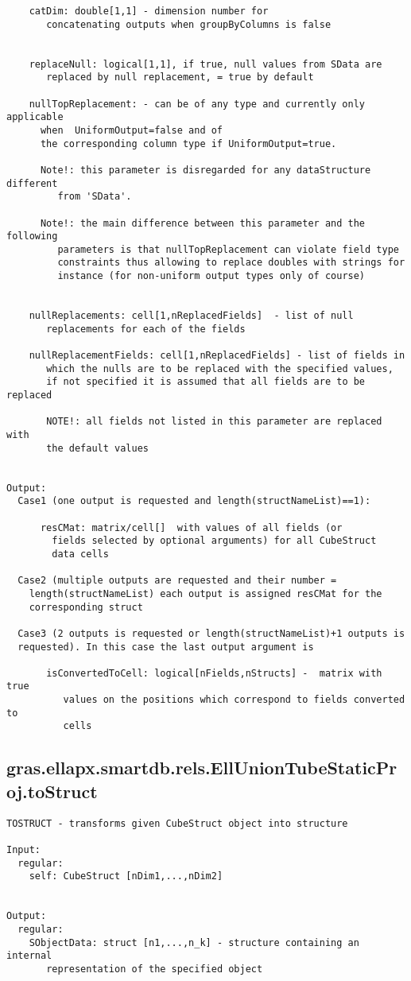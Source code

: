 \begin{verbatim}
    catDim: double[1,1] - dimension number for
       concatenating outputs when groupByColumns is false


    replaceNull: logical[1,1], if true, null values from SData are
       replaced by null replacement, = true by default

    nullTopReplacement: - can be of any type and currently only applicable
      when  UniformOutput=false and of
      the corresponding column type if UniformOutput=true.

      Note!: this parameter is disregarded for any dataStructure different
         from 'SData'.

      Note!: the main difference between this parameter and the following
         parameters is that nullTopReplacement can violate field type
         constraints thus allowing to replace doubles with strings for
         instance (for non-uniform output types only of course)


    nullReplacements: cell[1,nReplacedFields]  - list of null
       replacements for each of the fields

    nullReplacementFields: cell[1,nReplacedFields] - list of fields in
       which the nulls are to be replaced with the specified values,
       if not specified it is assumed that all fields are to be replaced

       NOTE!: all fields not listed in this parameter are replaced with
       the default values


Output:
  Case1 (one output is requested and length(structNameList)==1):

      resCMat: matrix/cell[]  with values of all fields (or
        fields selected by optional arguments) for all CubeStruct
        data cells

  Case2 (multiple outputs are requested and their number =
    length(structNameList) each output is assigned resCMat for the
    corresponding struct

  Case3 (2 outputs is requested or length(structNameList)+1 outputs is
  requested). In this case the last output argument is

       isConvertedToCell: logical[nFields,nStructs] -  matrix with true
          values on the positions which correspond to fields converted to
          cells
\end{verbatim}
\subsection{\texorpdfstring{gras.ellapx.smartdb.rels.EllUnionTubeStaticProj.toStruct}{toStruct}}\label{method:gras.ellapx.smartdb.rels.EllUnionTubeStaticProj.toStruct}
\begin{verbatim}
TOSTRUCT - transforms given CubeStruct object into structure

Input:
  regular:
    self: CubeStruct [nDim1,...,nDim2]


Output:
  regular:
    SObjectData: struct [n1,...,n_k] - structure containing an internal
       representation of the specified object
\end{verbatim}
